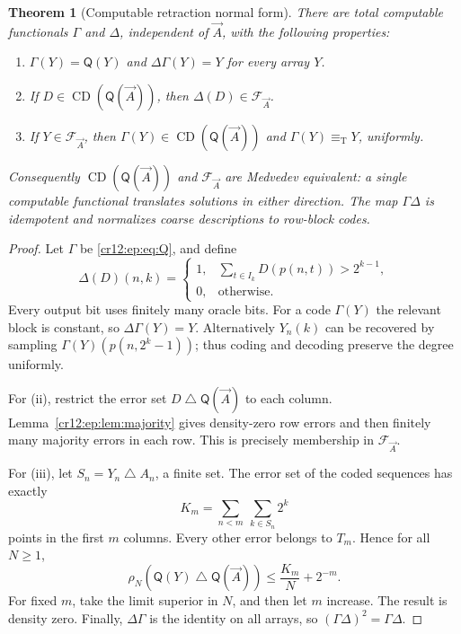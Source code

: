 \documentclass[11pt,letterpaper]{article}
\theoremstyle{plain}
\newtheorem{theorem}{Theorem}[section]
\theoremstyle{definition}
\theoremstyle{remark}
\numberwithin{equation}{section}
\newcommand{\eqT}{\equiv_{\mathrm T}}
\newcommand{\CD}{\operatorname{CD}}
\newcommand{\sd}{\mathbin{\triangle}}
\newcommand{\QQ}{\mathsf Q}              %
\newcommand{\FF}{\mathcal F}             %
\begin{document}
\begin{theorem}[Computable retraction normal form]\label{cr12:ep:thm:normal}
There are total computable functionals $\Gamma$ and $\Delta$, independent of
$\vec A$, with the following properties:
\begin{enumerate}[label=\textup{(\roman*)}]
\item $\Gamma(Y)=\QQ(Y)$ and $\Delta\Gamma(Y)=Y$ for every array $Y$.
\item If $D\in\CD(\QQ(\vec A))$, then $\Delta(D)\in\FF_{\vec A}$.
\item If $Y\in\FF_{\vec A}$, then $\Gamma(Y)\in\CD(\QQ(\vec A))$ and $\Gamma(Y)\eqT Y$,
uniformly.
\end{enumerate}
Consequently $\CD(\QQ(\vec A))$ and $\FF_{\vec A}$ are Medvedev equivalent: a single
computable functional translates solutions in either direction. The map
$\Gamma\Delta$ is idempotent and normalizes coarse descriptions to row-block codes.
\end{theorem}
\begin{proof}
Let $\Gamma$ be \eqref{cr12:ep:eq:Q}, and define
\[
 \Delta(D)(n,k)=
 \begin{cases}
 1,&\displaystyle\sum_{t\in I_k}D(p(n,t))>2^{k-1},\\
 0,&\text{otherwise}.
 \end{cases}
\]
Every output bit uses finitely many oracle bits. For a code $\Gamma(Y)$ the relevant
block is constant, so $\Delta\Gamma(Y)=Y$. Alternatively $Y_n(k)$ can be recovered
by sampling $\Gamma(Y)(p(n,2^k-1))$; thus coding and decoding preserve the degree
uniformly.

For (ii), restrict the error set $D\sd\QQ(\vec A)$ to each column.
Lemma~\ref{cr12:ep:lem:majority} gives density-zero row errors and then finitely many
majority errors in each row. This is precisely membership in $\FF_{\vec A}$.

For (iii), let $S_n=Y_n\sd A_n$, a finite set. The error set of the coded sequences
has exactly
\begin{equation}\label{cr12:ep:eq:Km}
 K_m=\sum_{n<m}\ \sum_{k\in S_n}2^k
\end{equation}
points in the first $m$ columns. Every other error belongs to $T_m$. Hence for all
$N\ge1$,
\begin{equation}\label{cr12:ep:eq:tailbound}
 \rho_N(\QQ(Y)\sd\QQ(\vec A))
 \le \frac{K_m}{N}+2^{-m}.
\end{equation}
For fixed $m$, take the limit superior in $N$, and then let $m$ increase. The result
is density zero. Finally, $\Delta\Gamma$ is the identity on all arrays, so
$(\Gamma\Delta)^2=\Gamma\Delta$.
\end{proof}
\end{document}
